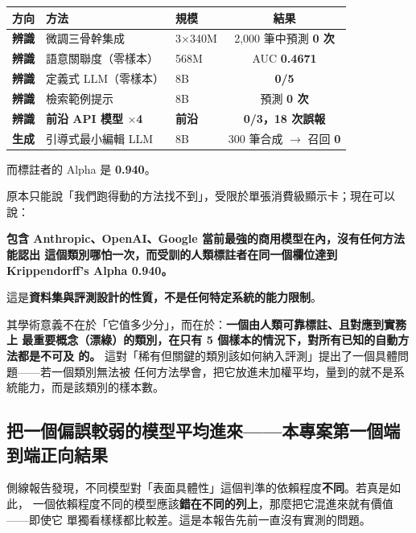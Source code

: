 \documentclass[11pt,a4paper]{ctexart}
\begin{document}
\begin{table}[h]
\centering\small
\begin{tabular}{@{}lllc@{}}
\toprule
方向 & 方法 & 規模 & 結果 \\
\midrule
\textbf{辨識} & 微調三骨幹集成 & 3$\times$340M & 2{,}000 筆中預測 \textbf{0 次} \\
\textbf{辨識} & 語意關聯度（零樣本） & 568M & AUC \textbf{0.4671} \\
\textbf{辨識} & 定義式 LLM（零樣本） & 8B & \textbf{0/5} \\
\textbf{辨識} & 檢索範例提示 & 8B & 預測 \textbf{0 次} \\
\rowcolor{red!10}
\textbf{辨識} & \textbf{前沿 API 模型 $\times$4} & \textbf{前沿} & \textbf{0/3，18 次誤報} \\
\textbf{生成} & 引導式最小編輯 LLM & 8B & 300 筆合成 $\to$ 召回 \textbf{0} \\
\bottomrule
\end{tabular}
\end{table}

而標註者的 Alpha 是 \textbf{0.940}。

\begin{tcolorbox}[colback=red!5, colframe=red!55, title=加入前沿模型後，主張的性質改變了]
原本只能說「我們跑得動的方法找不到」，受限於單張消費級顯示卡；現在可以說：

\medskip
\textbf{包含 Anthropic、OpenAI、Google 當前最強的商用模型在內，沒有任何方法能認出
這個類別哪怕一次，而受訓的人類標註者在同一個欄位達到 Krippendorff's Alpha 0.940。}

\medskip
這是\textbf{資料集與評測設計的性質，不是任何特定系統的能力限制}。

\medskip
其學術意義不在於「它值多少分」，而在於：\textbf{一個由人類可靠標註、且對應到實務上
最重要概念（漂綠）的類別，在只有 5 個樣本的情況下，對所有已知的自動方法都是不可及
的。} 這對「稀有但關鍵的類別該如何納入評測」提出了一個具體問題——若一個類別無法被
任何方法學會，把它放進未加權平均，量到的就不是系統能力，而是該類別的樣本數。
\end{tcolorbox}

\subsection{把一個偏誤較弱的模型平均進來——本專案第一個端到端正向結果}
\label{sec:recombine}

側線報告發現，不同模型對「表面具體性」這個判準的依賴程度\textbf{不同}。若真是如此，
一個依賴程度不同的模型應該\textbf{錯在不同的列上}，那麼把它混進來就有價值——即使它
單獨看樣樣都比較差。這是本報告先前一直沒有實測的問題。
\end{document}
